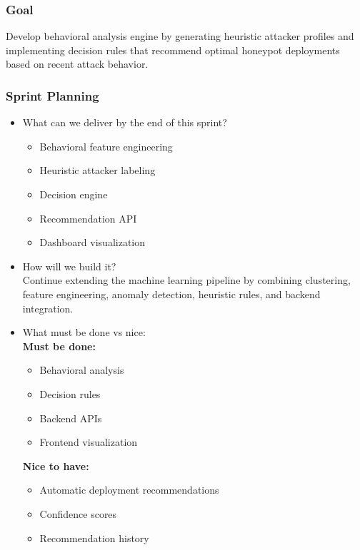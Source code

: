 \documentclass{article}
\begin{document}
\subsubsection{Goal}
Develop behavioral analysis engine by generating heuristic attacker profiles and implementing decision rules that recommend optimal honeypot deployments based on recent attack behavior.


\subsubsection{Sprint Planning}

\begin{itemize}
    \item What can we deliver by the end of this sprint? 
    \begin{itemize}
    \item Behavioral feature engineering
    \item Heuristic attacker labeling
    \item Decision engine
    \item Recommendation API
    \item Dashboard visualization
    \end{itemize}
    
    \item How will we build it? 
\\

    Continue extending the machine learning pipeline by combining clustering, feature engineering, anomaly detection, heuristic rules, and backend integration.

  
    \item What must be done vs nice:
    \\\textbf{Must be done:}
    \begin{itemize}
    \item Behavioral analysis
    \item Decision rules
    \item Backend APIs
    \item Frontend visualization
    \end{itemize}
    
    \textbf{Nice to have:}
    \begin{itemize}
    \item Automatic deployment recommendations
    \item Confidence scores
    \item Recommendation history
    \end{itemize}

\end{itemize}
\end{document}
